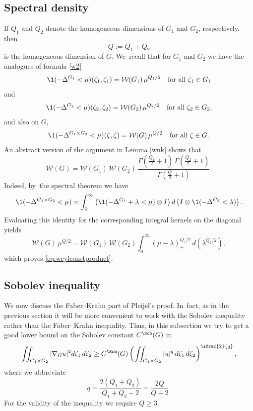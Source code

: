 \subsection{Spectral density}
If $Q_1$ and $Q_2$ denote the homogeneous dimensions of $G_1$ and $G_2$, respectively, then
\[
Q:= Q_1 + Q_2
\]
is the homogeneous dimension of $G$. We~recall that for $G_1$ and $G_2$ we have the analogues of formula \eqref{w2}
\[
\1(-\Delta^{G_1} <\mu)(\zeta_1,\zeta_1)=\mathcal W(G_1) \,\mu^{Q_1/2}
\quad\text{for all}\ \zeta_1 \in G_1
\]
and
\[
\1 (-\Delta^{G_2} <\mu)(\zeta_2,\zeta_2)=\mathcal W(G_2) \,\mu^{Q_2/2}
\quad\text{for all}\ \zeta_2 \in G_2,
\]
and also on $G$,
\begin{equation}
\1 (-\Delta^{G_1\times G_2} <\mu)(\zeta,\zeta)= \mathcal W(G) \,\mu^{Q/2} \quad\text{for all}\ \zeta\in G.
\end{equation}
An abstract version of the argument in Lemma \ref{wnk} shows that
\begin{equation}\label{eq:weylconstproduct}
\mathcal W(G) = \mathcal W(G_1) \,\mathcal W(G_2) \,\frac{\Gamma(\frac{Q_1}2 +1) \,\Gamma(\frac{Q_2}2 +1)}{\Gamma (\frac Q2+1)}.
\end{equation}
Indeed, by~the spectral theorem we have
\[
\1 (-\Delta^{G_1\times G_2} <\mu) = \int_0^\infty \left(\1(-\Delta^{G_1} + \lambda <\mu) \otimes I\right) d \left(I \otimes \1(-\Delta^{G_2}<\lambda)\right).
\]
Evaluating this identity for the corresponding integral kernels on the diagonal yields
\[
\mathcal W(G) \,\mu^{Q/2} = \mathcal W(G_1) \,\mathcal W(G_2) \int_0^\infty (\mu-\lambda)_+^{Q_1/2} \,d \left(\lambda^{Q_2/2}\right),
\]
which proves \eqref{eq:weylconstproduct}.

\subsection{Sobolev inequality}
We now discuss the Faber--Krahn part of Pleijel's proof. In~fact, as in the previous section it will be more convenient to work with the Sobolev inequality rather than the Faber--Krahn inequality. Thus, in this subsection we try to get a good lower bound on the Sobolev constant $C^\Sob(G)$ in
\[
\iint_{G_1\times G_2} |\nabla_G u|^2 d\zeta_1\,d\zeta_2 \geq C^\Sob(G) \left(\iint_{G_1\times G_2} |u|^q \,d\zeta_1\,d\zeta_2\right)^\sfrac{2}{q},
\]
where we abbreviate
\[
q= \frac{2(Q_1+Q_2)}{Q_1+Q_2-2}= \frac{2 Q}{Q-2}.
\]
For the validity of the inequality we require $Q\geq 3$.

